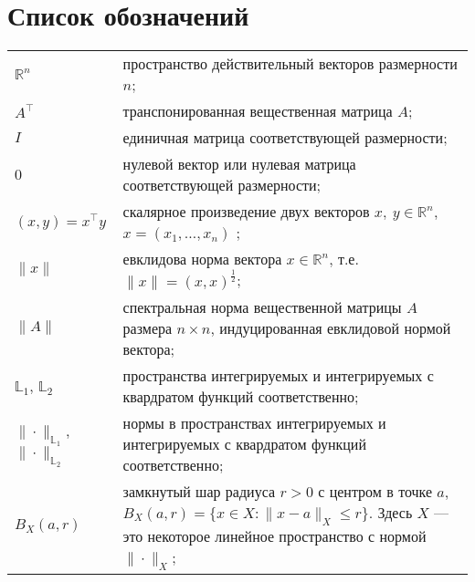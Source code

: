 \documentclass[../main.tex]{subfiles}
\begin{document}
\clearpage
\section*{Список обозначений}
\begin{tabularx}{\textwidth}{lY}
	$\mathbb{R}^n$ & пространство действительный векторов размерности $n$; \\ 
	$A^{\top}$ & транспонированная вещественная матрица $A$; \\ 
	$I$ & единичная матрица соответствующей размерности; \\ 
	$0$ & нулевой вектор или нулевая матрица соответствующей размерности; \\
	$(x,y)=x^{\top}y$ & скалярное произведение двух векторов $x,\ y \in \mathbb{R}^n $, $x = (x_1,\dots,x_n)$ ; \\
	$\|x\| $ & евклидова норма вектора $x \in \mathbb{R}^n$, т.е. $\|x\| = (x,x)^{\frac{1}{2}}$; \\
	$\|A\|$ & спектральная норма вещественной  матрицы $A$ размера $n \times n$, индуцированная евклидовой нормой вектора;\\ 
	$\mathbb{L}_1$, $\mathbb{L}_2$ & пространства интегрируемых и интегрируемых с квардратом функций соответственно; \\
	$\|\cdot\|_{\mathbb{L}_1}$, $\|\cdot\|_{\mathbb{L}_2}$ & нормы в пространствах интегрируемых и интегрируемых с квардратом функций соответственно; \\
	$B_X(a,r)$ & замкнутый шар радиуса $r>0$ с центром в точке $a$, $B_X(a, r) = \{x\in X: \|x-a\|_X \leqslant r \}$. Здесь $X$ --- это некоторое линейное пространство с нормой $\|\cdot\|_X$; 
\end{tabularx}
\end{document}
